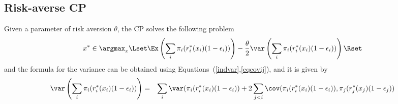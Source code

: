 \subsection{Risk-averse CP}
Given a parameter of risk aversion $\theta$, the CP solves the following problem
\[x^*\in\argmax_{x} \Lset \Ex\left(\sum_i \pi_i(r^*_i(x_i)(1-\epsilon_i))\right) - \frac{\theta}{2}\var\left(\sum_i \pi_i(r^*_i(x_i)(1-\epsilon_i))\right)\Rset\]
and the formula for the variance can be obtained using Equations~(\ref{indvar},\ref{eqcovij}), and it is given by
\begin{eqnarray*}
\var\left(\sum_i \pi_i(r^*_i(x_i)(1-\epsilon_i))\right)&=&\sum_i \var(\pi_i(r^*_i(x_i)(1-\epsilon_i))+2\sum_{j<i}\cov(\pi_i(r^*_i(x_i)(1-\epsilon_i)),\pi_j(r^*_j(x_j)(1-\epsilon_j))\\
\end{eqnarray*}